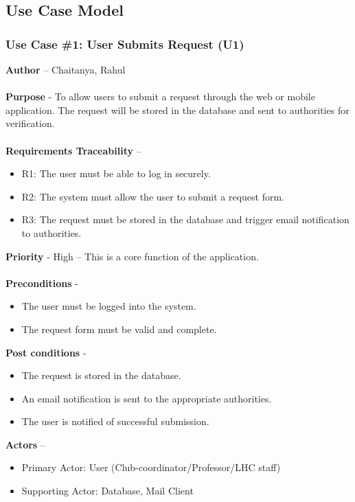 \documentclass[a4paper,12pt]{article}
\begin{document}
\newpage
\subsection{Use Case Model} \label{subsec:use_case_model}

 \subsubsection{Use Case \#1: User Submits Request (U1)}
\textbf{Author} – Chaitanya, Rahul \\\\
\textbf{Purpose} - To allow users to submit a request through the web or mobile application. The request will be stored in the database and sent to authorities for verification. \\\\
\textbf{Requirements Traceability} – 
\begin{itemize} 
    \item R1: The user must be able to log in securely.
    \item R2: The system must allow the user to submit a request form.
    \item R3: The request must be stored in the database and trigger email notification to authorities.
\end{itemize}
\textbf{Priority} - High – This is a core function of the application. \\\\
\textbf{Preconditions} - 
\begin{itemize} 
    \item The user must be logged into the system.
    \item The request form must be valid and complete.
\end{itemize}
\textbf{Post conditions} - 
\begin{itemize} 
    \item The request is stored in the database.
    \item An email notification is sent to the appropriate authorities.
    \item The user is notified of successful submission.
\end{itemize}
\textbf{Actors} – 
\begin{itemize} 
    \item Primary Actor: User (Club-coordinator/Professor/LHC staff)
    \item Supporting Actor: Database, Mail Client
\end{itemize}
\end{document}
